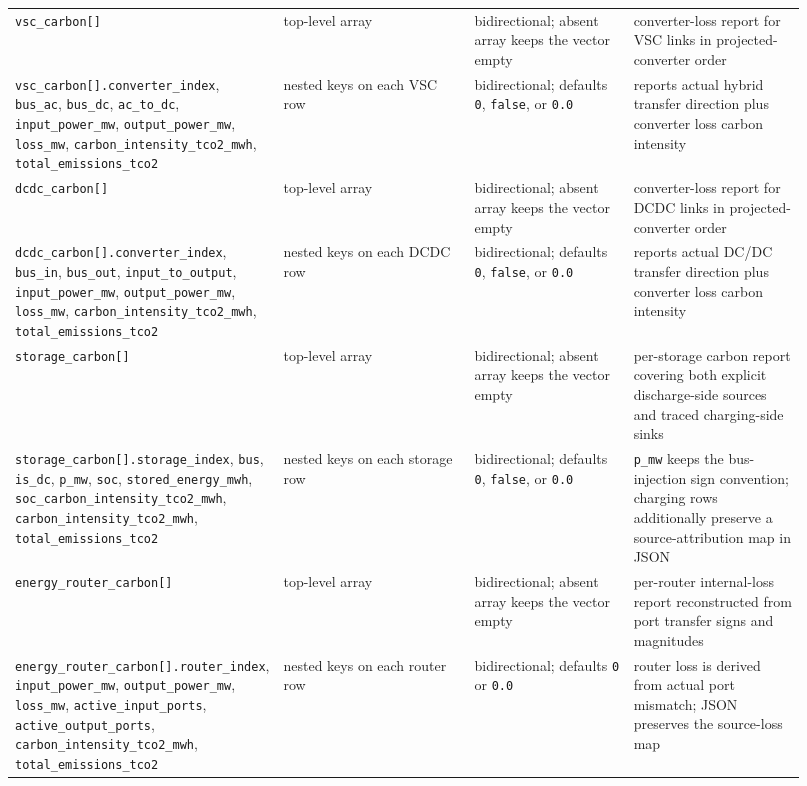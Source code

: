 \begin{longtable}{@{}L{0.17\linewidth}L{0.29\linewidth}L{0.22\linewidth}L{0.24\linewidth}@{}}
\texttt{vsc\_carbon[]} & top-level array & bidirectional; absent array keeps the vector empty & converter-loss report for VSC links in projected-converter order \\
\texttt{vsc\_carbon[].converter\_index}, \texttt{bus\_ac}, \texttt{bus\_dc}, \texttt{ac\_to\_dc}, \texttt{input\_power\_mw}, \texttt{output\_power\_mw}, \texttt{loss\_mw}, \texttt{carbon\_intensity\_tco2\_mwh}, \texttt{total\_emissions\_tco2} & nested keys on each VSC row & bidirectional; defaults \texttt{0}, \texttt{false}, or \texttt{0.0} & reports actual hybrid transfer direction plus converter loss carbon intensity \\
\texttt{dcdc\_carbon[]} & top-level array & bidirectional; absent array keeps the vector empty & converter-loss report for DCDC links in projected-converter order \\
\texttt{dcdc\_carbon[].converter\_index}, \texttt{bus\_in}, \texttt{bus\_out}, \texttt{input\_to\_output}, \texttt{input\_power\_mw}, \texttt{output\_power\_mw}, \texttt{loss\_mw}, \texttt{carbon\_intensity\_tco2\_mwh}, \texttt{total\_emissions\_tco2} & nested keys on each DCDC row & bidirectional; defaults \texttt{0}, \texttt{false}, or \texttt{0.0} & reports actual DC/DC transfer direction plus converter loss carbon intensity \\
\texttt{storage\_carbon[]} & top-level array & bidirectional; absent array keeps the vector empty & per-storage carbon report covering both explicit discharge-side sources and traced charging-side sinks \\
\texttt{storage\_carbon[].storage\_index}, \texttt{bus}, \texttt{is\_dc}, \texttt{p\_mw}, \texttt{soc}, \texttt{stored\_energy\_mwh}, \texttt{soc\_carbon\_intensity\_tco2\_mwh}, \texttt{carbon\_intensity\_tco2\_mwh}, \texttt{total\_emissions\_tco2} & nested keys on each storage row & bidirectional; defaults \texttt{0}, \texttt{false}, or \texttt{0.0} & \texttt{p\_mw} keeps the bus-injection sign convention; charging rows additionally preserve a source-attribution map in JSON \\
\texttt{energy\_router\_carbon[]} & top-level array & bidirectional; absent array keeps the vector empty & per-router internal-loss report reconstructed from port transfer signs and magnitudes \\
\texttt{energy\_router\_carbon[].router\_index}, \texttt{input\_power\_mw}, \texttt{output\_power\_mw}, \texttt{loss\_mw}, \texttt{active\_input\_ports}, \texttt{active\_output\_ports}, \texttt{carbon\_intensity\_tco2\_mwh}, \texttt{total\_emissions\_tco2} & nested keys on each router row & bidirectional; defaults \texttt{0} or \texttt{0.0} & router loss is derived from actual port mismatch; JSON preserves the source-loss map \\

\end{longtable}
